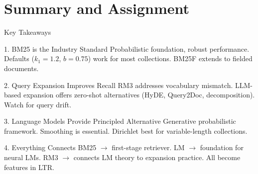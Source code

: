 \documentclass[aspectratio=169]{beamer}
\begin{document}
\section{Summary and Assignment}

\begin{frame}[plain]
\sectionpage
\end{frame}

\begin{frame}{Key Takeaways}
\begin{block}{1. BM25 is the Industry Standard}
Probabilistic foundation, robust performance. Defaults ($k_1=1.2$, $b=0.75$) work for most collections. BM25F extends to fielded documents.
\end{block}

\begin{block}{2. Query Expansion Improves Recall}
RM3 addresses vocabulary mismatch. LLM-based expansion offers zero-shot alternatives (HyDE, Query2Doc, decomposition). Watch for query drift.
\end{block}

\begin{block}{3. Language Models Provide Principled Alternative}
Generative probabilistic framework. Smoothing is essential. Dirichlet best for variable-length collections.
\end{block}

\begin{block}{4. Everything Connects}
BM25 $\to$ first-stage retriever. LM $\to$ foundation for neural LMs. RM3 $\to$ connects LM theory to expansion practice. All become features in LTR.
\end{block}
\end{frame}
\end{document}
